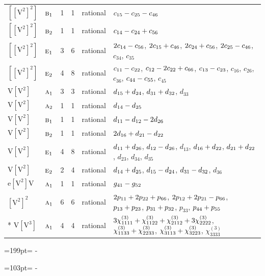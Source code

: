 \documentclass[10pt,a4paper]{article}
\newcommand{\needspace}[1]{\par\penalty-100\begingroup\dimen0=#1\relax\dimen2=\pagegoal
  \advance\dimen2-\pagetotal\ifdim\dimen0>\dimen2\relax\ifdim\dimen2>0pt\vfil\break\fi\fi
  \endgroup}
\numberwithin{equation}{section}
\newcommand{\irr}[1]{\text{\normalfont\scshape #1}}
\newcommand{\jahn}[1]{\mathrm{#1}}
\newlength{\fillwidth}\newlength{\cellwidth}\newlength{\colwidth}
\newcommand{\signbreak}{\penalty100\relax}
\begin{document}
{\begin{longtable}{@{}llrrl>{\RaggedRight\arraybackslash}p{\fillwidth}@{}}
$\jahn{[[V^{2}]^{2}]}$ & $\irr{b}_{1}$ & 1 & 1 & rational & $c_{15} -\signbreak c_{25} -\signbreak c_{46}$\\
$\jahn{[[V^{2}]^{2}]}$ & $\irr{b}_{2}$ & 1 & 1 & rational & $c_{14} -\signbreak c_{24} +\signbreak c_{56}$\\
$\jahn{[[V^{2}]^{2}]}$ & $\irr{e}_{1}$ & 3 & 6 & rational & $2c_{14} -\signbreak c_{56}$, $2c_{15} +\signbreak c_{46}$, $2c_{24} +\signbreak c_{56}$, $2c_{25} -\signbreak c_{46}$, $c_{34}$, $c_{35}$\\
$\jahn{[[V^{2}]^{2}]}$ & $\irr{e}_{2}$ & 4 & 8 & rational & $c_{11} -\signbreak c_{22}$, $c_{12} -\signbreak 2c_{22} +\signbreak c_{66}$, $c_{13} -\signbreak c_{23}$, $c_{16}$, $c_{26}$, $c_{36}$, $c_{44} -\signbreak c_{55}$, $c_{45}$\\
$\jahn{V[V^{2}]}$ & $\irr{a}_{1}$ & 3 & 3 & rational & $d_{15} +\signbreak d_{24}$, $d_{31} +\signbreak d_{32}$, $d_{33}$\\
$\jahn{V[V^{2}]}$ & $\irr{a}_{2}$ & 1 & 1 & rational & $d_{14} -\signbreak d_{25}$\\
$\jahn{V[V^{2}]}$ & $\irr{b}_{1}$ & 1 & 1 & rational & $d_{11} -\signbreak d_{12} -\signbreak 2d_{26}$\\
$\jahn{V[V^{2}]}$ & $\irr{b}_{2}$ & 1 & 1 & rational & $2d_{16} +\signbreak d_{21} -\signbreak d_{22}$\\
$\jahn{V[V^{2}]}$ & $\irr{e}_{1}$ & 4 & 8 & rational & $d_{11} +\signbreak d_{26}$, $d_{12} -\signbreak d_{26}$, $d_{13}$, $d_{16} +\signbreak d_{22}$, $d_{21} +\signbreak d_{22}$, $d_{23}$, $d_{34}$, $d_{35}$\\
$\jahn{V[V^{2}]}$ & $\irr{e}_{2}$ & 2 & 4 & rational & $d_{14} +\signbreak d_{25}$, $d_{15} -\signbreak d_{24}$, $d_{31} -\signbreak d_{32}$, $d_{36}$\\
$\jahn{e[V^{2}]V}$ & $\irr{a}_{1}$ & 1 & 1 & rational & $\mathnormal{g}_{41} -\signbreak \mathnormal{g}_{52}$\\
$\jahn{[V^{2}]^{2}}$ & $\irr{a}_{1}$ & 6 & 6 & rational & $2p_{11} +\signbreak 2p_{22} +\signbreak p_{66}$, $2p_{12} +\signbreak 2p_{21} -\signbreak p_{66}$, $p_{13} +\signbreak p_{23}$, $p_{31} +\signbreak p_{32}$, $p_{33}$, $p_{44} +\signbreak p_{55}$\\*
$\jahn{V[V^{3}]}$ & $\irr{a}_{1}$ & 4 & 4 & rational & $3\chi^{(3)}_{1111} +\signbreak \chi^{(3)}_{1122} +\signbreak \chi^{(3)}_{2112} +\signbreak 3\chi^{(3)}_{2222}$, $\chi^{(3)}_{1133} +\signbreak \chi^{(3)}_{2233}$, $\chi^{(3)}_{3113} +\signbreak \chi^{(3)}_{3223}$, $\chi^{(3)}_{3333}$\\
\bottomrule\end{longtable}}
\needspace{199pt}
\needspace{103pt}
\end{document}
